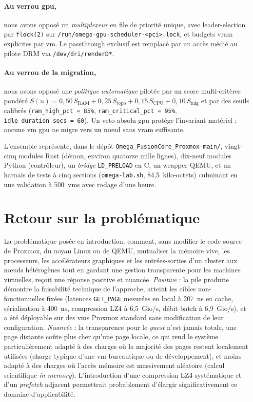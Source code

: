\paragraph{Au verrou \acrshort{gpu},} nous avons opposé un \emph{multiplexeur} en file de priorité unique, avec leader-election par \texttt{flock(2)} sur \texttt{/run/omega-gpu-scheduler-<pci>.lock}, et budgets \acrshort{vram} explicites par \acrshort{vm}. Le passthrough exclusif est remplacé par un accès médié au pilote DRM via \texttt{/dev/dri/renderD*}.

\paragraph{Au verrou de la migration,} nous avons opposé une \emph{politique automatique} pilotée par un score multi-critères pondéré $S(n) = 0{,}50\,S_{\text{RAM}} + 0{,}25\,S_{\text{topo}} + 0{,}15\,S_{\text{CPU}} + 0{,}10\,S_{\text{mig}}$ et par des seuils calibrés (\texttt{ram\_high\_pct~=~85\%}, \texttt{ram\_critical\_pct~=~95\%}, \texttt{idle\_duration\_secs~=~60}). Un veto absolu \acrshort{gpu} protège l'invariant matériel : aucune \acrshort{vm} \acrshort{gpu} ne migre vers un nœud sans \acrshort{vram} suffisante.

L'ensemble représente, dans le dépôt \texttt{Omega\_FusionCore\_Proxmox-main/}, vingt-cinq modules Rust (démon, environ quatorze mille lignes), dix-neuf modules Python (contrôleur), un \emph{bridge} \texttt{LD\_PRELOAD} en C, un wrapper QEMU, et un harnais de tests à cinq sections (\texttt{omega-lab.sh}, 84,5~kilo-octets) culminant en une validation à 500~\acrshort{vm}s avec rodage d'une heure.

\section*{Retour sur la problématique}

La problématique posée en introduction, comment, sans modifier le code source de Proxmox, du noyau Linux ou de QEMU, mutualiser la mémoire vive, les processeurs, les accélérateurs graphiques et les entrées-sorties d'un cluster aux nœuds hétérogènes tout en gardant une gestion transparente pour les machines virtuelles, reçoit une réponse positive et nuancée. \emph{Positive} : la pile produite démontre la faisabilité technique de l'approche, atteint les cibles non-fonctionnelles fixées (latences \texttt{GET\_PAGE} mesurées en local à 207~ns en cache, sérialisation à 400~ns, compression LZ4 à 6,5~Gio/s, débit batch à 6,9~Gio/s), et a été déployable sur des \acrshort{vm}s Proxmox standard sans modification de leur configuration. \emph{Nuancée} : la transparence pour le \emph{guest} n'est jamais totale, une page distante coûte plus cher qu'une page locale, ce qui rend le système particulièrement adapté à des charges où la majorité des pages restent localement utilisées (charge typique d'une \acrshort{vm} bureautique ou de développement), et moins adapté à des charges où l'accès mémoire est massivement aléatoire (calcul scientifique \emph{in-memory}). L'introduction d'une compression LZ4 systématique et d'un \emph{prefetch} adjacent permettrait probablement d'élargir significativement ce domaine d'applicabilité.

